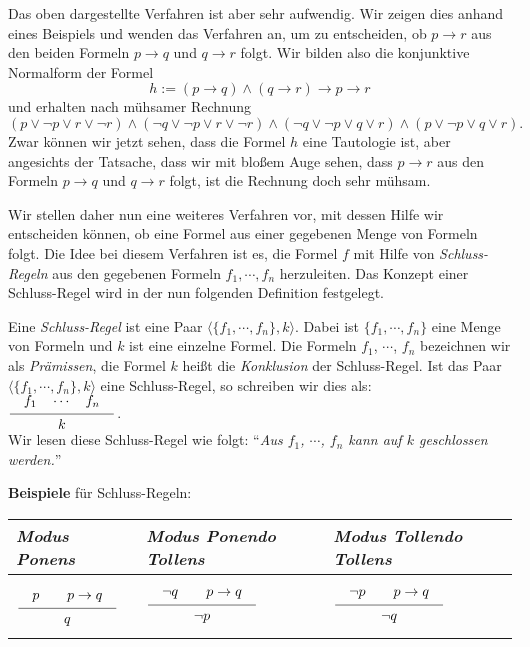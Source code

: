 Das oben dargestellte Verfahren ist aber sehr aufwendig.  Wir zeigen dies anhand eines
Beispiels und wenden das Verfahren
an, um zu entscheiden, ob $p \rightarrow r$ aus den beiden Formeln $p \rightarrow q$ und
$q \rightarrow r$ folgt.   Wir bilden also die konjunktive Normalform der Formel 
\[ h := (p \rightarrow q) \wedge (q \rightarrow r) \rightarrow p \rightarrow r
\]
und erhalten nach m\"{u}hsamer Rechnung
\[
   (p \vee \neg p \vee r \vee \neg r) \wedge (\neg q \vee \neg p \vee r \vee \neg r) \wedge
   (\neg q \vee \neg p \vee q \vee r) \wedge (p \vee \neg p \vee q \vee r). 
\]
Zwar k\"{o}nnen wir jetzt sehen, dass die Formel $h$ eine Tautologie ist, aber angesichts der
Tatsache, dass wir mit blo\ss{}em Auge sehen, dass  $p \rightarrow r$ aus den Formeln $p \rightarrow q$ und
$q \rightarrow r$ folgt, ist die Rechnung  doch  sehr m\"{u}hsam.

Wir stellen daher nun eine weiteres Verfahren vor, mit dessen Hilfe wir entscheiden
k\"{o}nnen, ob eine Formel aus einer gegebenen Menge von Formeln folgt.  Die Idee bei diesem Verfahren
ist es, die Formel $f$ mit Hilfe von \emph{\color{blue}Schluss-Regeln} aus den gegebenen Formeln 
$f_1, \cdots, f_n$ herzuleiten.
  Das Konzept einer Schluss-Regel wird in der nun folgenden Definition festgelegt.
\begin{Definition}
    Eine \emph{\color{blue}Schluss-Regel} ist eine Paar  $\langle \{f_1, \cdots, f_n\}, k \rangle$.
    Dabei ist 
    $\{f_1, \cdots, f_n\}$ eine Menge von Formeln und $k$ ist eine einzelne Formel.  
    Die Formeln $f_1$, $\cdots$, $f_n$ bezeichnen wir als
    \emph{\color{blue}Pr\"{a}missen}, die Formel $k$ hei\ss{}t die \emph{\color{blue}Konklusion} der Schluss-Regel.
    Ist das Paar 
    $\langle \{f_1, \cdots, f_n\}, k \rangle$ eine Schluss-Regel, so schreiben wir
    dies als: 
    \\[0.3cm]
    \hspace*{1.3cm}      
    $\schluss{f_1 \quad \cdots \quad f_n}{k}$.
    \\[0.3cm]
    Wir lesen diese Schluss-Regel wie folgt: 
    ``\textsl{Aus $f_1$, $\cdots$, $f_n$ kann auf $k$ geschlossen werden.}''
    \eox
\end{Definition}
\vspace*{0.3cm}

\noindent
\textbf{Beispiele} f\"{u}r Schluss-Regeln: 
\\[0.2cm]
\hspace*{1.3cm}            
\begin{tabular}[t]{|l|l|l|}
\hline
\rule{0pt}{15pt} \emph{\color{blue}Modus Ponens} & \emph{\color{blue}Modus Ponendo Tollens} & \emph{\color{blue}Modus Tollendo Tollens} \\[0.3cm]
\hline
$
\rule[-15pt]{0pt}{40pt}\schluss{p \quad\quad p \rightarrow q}{q}$ &
$\schluss{\neg q \quad\quad p \rightarrow q}{\neg p}$ &
$\schluss{\neg p \quad\quad p \rightarrow q}{\neg q}$ \\[0.3cm]
\hline
\end{tabular}
\\[0.3cm]

